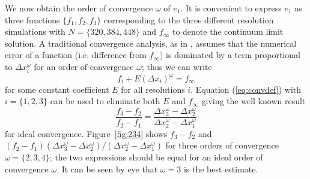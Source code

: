 We now obtain the order of convergence $\omega$ of $e_1$. It is convenient to express $e_1$ as three functions $\{f_1,f_2,f_3\}$ corresponding to the three different resolution simulations with $N=\{320,384,448\}$ and $f_\infty$ to denote the continuum limit solution. A traditional convergence analysis, as in \cite{PresTeukVettFlan92}, assumes that the numerical error of a function (i.e. difference from $f_\infty$) is dominated by a term proportional to $\Delta x_i^\omega$ for an order of convergence $\omega$; thus we can write
\begin{equation}\label{eq:convdef}f_i + E (\Delta x_i)^\omega = f_\infty\end{equation} 
for some constant coefficient $E$ for all resolutions $i$. Equation (\ref{eq:convdef}) with $i=\{1,2,3\}$ can be used to eliminate both $E$ and $f_\infty$ giving the well known result
\begin{equation}
\label{eq:trad_conv_def}\frac{f_3-f_2}{f_2-f_1} = \frac{ \Delta x_3^\omega-\Delta x_2^\omega }{ \Delta x_2^\omega-\Delta x_1^\omega }
\end{equation}
for ideal convergence. Figure~\ref{fig:234} shows $f_3-f_2$ and $(f_2-f_1 )(\Delta x_3^\omega - \Delta x_2^\omega)/(\Delta x_2^\omega - \Delta x_1^\omega)$ for three orders of convergence $\omega=\{2,3,4\}$; the two expressions should be equal for an ideal order of convergence $\omega$. It can be seen by eye that $\omega=3$ is the best estimate.

